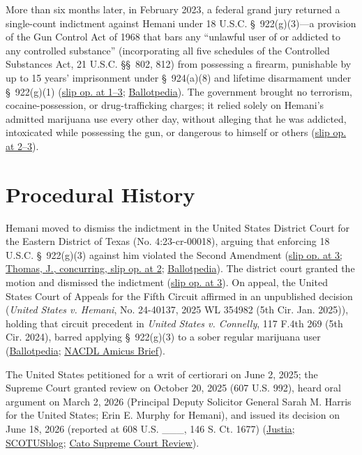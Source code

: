 \documentclass[12pt]{article}
\begin{document}
More than six months later, in February 2023, a federal grand jury returned a single-count indictment against Hemani under 18 U.S.C. \S~922(g)(3)---a provision of the Gun Control Act of 1968 that bars any ``unlawful user of or addicted to any controlled substance'' (incorporating all five schedules of the Controlled Substances Act, 21 U.S.C. \S\S~802, 812) from possessing a firearm, punishable by up to 15 years' imprisonment under \S~924(a)(8) and lifetime disarmament under \S~922(g)(1) (\href{https://supreme.justia.com/cases/federal/us/608/24-1234/}{slip op. at 1--3}; \href{https://ballotpedia.org/United_States_v._Hemani}{Ballotpedia}). The government brought no terrorism, cocaine-possession, or drug-trafficking charges; it relied solely on Hemani's admitted marijuana use every other day, without alleging that he was addicted, intoxicated while possessing the gun, or dangerous to himself or others (\href{https://supreme.justia.com/cases/federal/us/608/24-1234/}{slip op. at 2--3}).

\section{Procedural History}

Hemani moved to dismiss the indictment in the United States District Court for the Eastern District of Texas (No. 4:23-cr-00018), arguing that enforcing 18 U.S.C. \S~922(g)(3) against him violated the Second Amendment (\href{https://supreme.justia.com/cases/federal/us/608/24-1234/}{slip op. at 3; Thomas, J., concurring, slip op. at 2}; \href{https://ballotpedia.org/United_States_v._Hemani}{Ballotpedia}). The district court granted the motion and dismissed the indictment (\href{https://supreme.justia.com/cases/federal/us/608/24-1234/}{slip op. at 3}). On appeal, the United States Court of Appeals for the Fifth Circuit affirmed in an unpublished decision (\textit{United States v. Hemani}, No. 24-40137, 2025 WL 354982 (5th Cir. Jan. 2025)), holding that circuit precedent in \textit{United States v. Connelly}, 117 F.4th 269 (5th Cir. 2024), barred applying \S~922(g)(3) to a sober regular marijuana user (\href{https://ballotpedia.org/United_States_v._Hemani}{Ballotpedia}; \href{https://www.supremecourt.gov/DocketPDF/24/24-1234/395080/20260130130853936_Final\%20Hemani\%20NACDL\%20Amicus_1_30_26.pdf}{NACDL Amicus Brief}).

The United States petitioned for a writ of certiorari on June 2, 2025; the Supreme Court granted review on October 20, 2025 (607 U.S. 992), heard oral argument on March 2, 2026 (Principal Deputy Solicitor General Sarah M. Harris for the United States; Erin E. Murphy for Hemani), and issued its decision on June 18, 2026 (reported at 608 U.S. \_\_\_, 146 S. Ct. 1677) (\href{https://supreme.justia.com/cases/federal/us/608/24-1234/}{Justia}; \href{https://www.scotusblog.com/cases/united-states-v-hemani/}{SCOTUSblog}; \href{https://www.cato.org/sites/cato.org/files/2026-09/2025-2026-Supreme-Court-Review-7.pdf}{Cato Supreme Court Review}).
\end{document}
